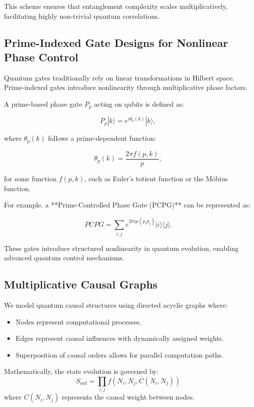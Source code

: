 \documentclass{article}
\theoremstyle{plain}
\begin{document}
\begin{itemize}
\begin{itemize}
This scheme ensures that entanglement complexity scales multiplicatively, facilitating highly non-trivial quantum correlations.

\subsection{Prime-Indexed Gate Designs for Nonlinear Phase Control}

Quantum gates traditionally rely on linear transformations in Hilbert space. Prime-indexed gates introduce nonlinearity through multiplicative phase factors.

A prime-based phase gate \( P_p \) acting on qubits is defined as:

\begin{equation}
P_p |k\rangle = e^{i \theta_p(k)} |k\rangle,
\end{equation}

where \( \theta_p(k) \) follows a prime-dependent function:

\begin{equation}
\theta_p(k) = \frac{2\pi f(p,k)}{p},
\end{equation}

for some function \( f(p,k) \), such as Euler's totient function or the Möbius function.

For example, a **Prime-Controlled Phase Gate (PCPG)** can be represented as:

\begin{equation}
PCPG = \sum_{i,j} e^{2\pi i \mu(p_i p_j)} |i\rangle \langle j|.
\end{equation}

These gates introduce structured nonlinearity in quantum evolution, enabling advanced quantum control mechanisms.

\subsection{Multiplicative Causal Graphs}
We model quantum causal structures using directed acyclic graphs where:
\begin{itemize}
    \item Nodes represent computational processes.
    \item Edges represent causal influences with dynamically assigned weights.
    \item Superposition of causal orders allows for parallel computation paths.
\end{itemize}
Mathematically, the state evolution is governed by:
\begin{equation}
S_{out} = \prod_{i,j} f(N_i, N_j, C(N_i, N_j))
\end{equation}
where $C(N_i, N_j)$ represents the causal weight between nodes.



\end{itemize}
\end{itemize}
\end{document}
